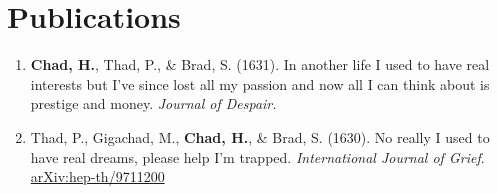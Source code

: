 \documentclass[letterpaper,11pt]{article}
\begin{document}
\section{Publications}
 \small{\begin{enumerate}[leftmargin=0.06\textwidth, label={}, itemindent=-0.03\textwidth]
 
     \item \hangindent=19cm \textbf{Chad, H.}, Thad, P., \& Brad, S. (1631). In another life I used to have real interests but I've since lost all my passion and now all I can think about is prestige and money. \textit{Journal of Despair.}
     
    \item \hangindent=19cm  Thad, P., Gigachad, M., \textbf{Chad, H.}, \& Brad, S. (1630). No really I used to have real dreams, please help I'm trapped. \textit{International Journal of Grief}.  \href{https://arxiv.org/abs/hep-th/9711200}{arXiv:hep-th/9711200}
\end{enumerate}}


\end{document}
